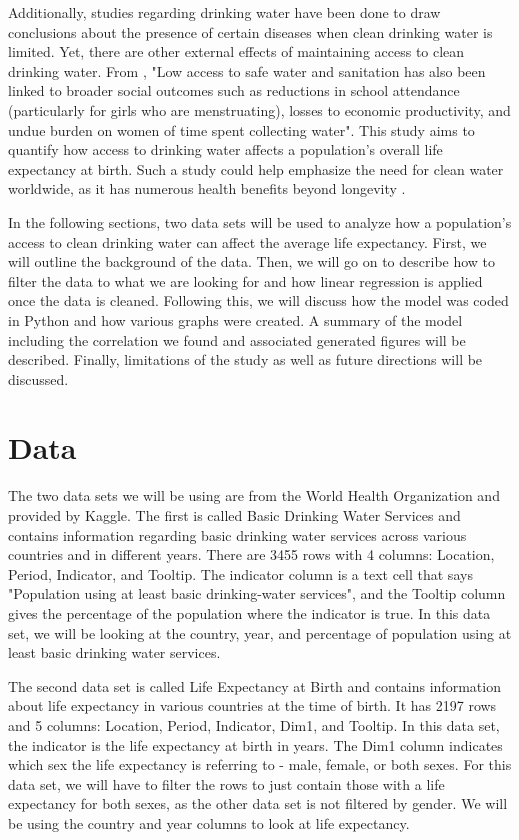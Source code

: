 \documentclass[12pt]{article}
\begin{document}
Additionally, studies regarding drinking water have been done to draw conclusions about the presence of certain diseases when clean drinking water is limited. Yet, there are other external effects of maintaining access to clean drinking water. From \citet{2020mappinggeo}, "Low access to safe water and sanitation has also been linked to broader social outcomes such as reductions in school attendance (particularly for girls who are menstruating), losses to economic productivity, and undue burden on women of time spent collecting water". This study aims to quantify how access to drinking water affects a population's overall life expectancy at birth. Such a study could help emphasize the need for clean water worldwide, as it has numerous health benefits beyond longevity \citep{popkin2010waterhealth}.

In the following sections, two data sets will be used to analyze how a population's access to clean drinking water can affect the average life expectancy. First, we will outline the background of the data. Then, we will go on to describe how to filter the data to what we are looking for and how linear regression is applied once the data is cleaned. Following this, we will discuss how the model was coded in Python and how various graphs were created. A summary of the model including the correlation we found and associated generated figures will be described. Finally, limitations of the study as well as future directions will be discussed.

\section{Data}

The two data sets we will be using are from the World Health Organization and provided by Kaggle. The first is called Basic Drinking Water Services and contains information regarding basic drinking water services across various countries and in different years. There are 3455 rows with 4 columns: Location, Period, Indicator, and Tooltip. The indicator column is a text cell that says "Population using at least basic drinking-water services", and the Tooltip column gives the percentage of the population where the indicator is true. In this data set, we will be looking at the country, year, and percentage of population using at least basic drinking water services.
  
The second data set is called Life Expectancy at Birth and contains information about life expectancy in various countries at the time of birth. It has 2197 rows and 5 columns: Location, Period, Indicator, Dim1, and Tooltip. In this data set, the indicator is the life expectancy at birth in years. The Dim1 column indicates which sex the life expectancy is referring to - male, female, or both sexes. For this data set, we will have to filter the rows to just contain those with a life expectancy for both sexes, as the other data set is not filtered by gender. We will be using the country and year columns to look at life expectancy.
\end{document}
